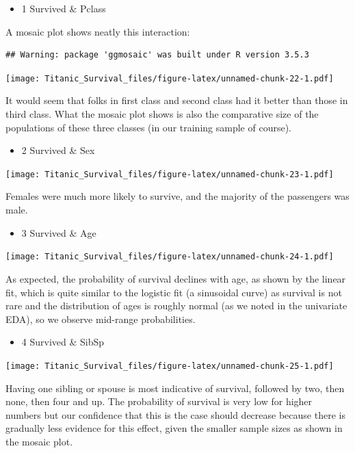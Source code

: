 \documentclass[]{article}
\providecommand{\tightlist}{%
  \setlength{\itemsep}{0pt}\setlength{\parskip}{0pt}}
\begin{document}
\begin{itemize}
\tightlist
\item
  1 Survived \& Pclass
\end{itemize}

A mosaic plot shows neatly this interaction:

\begin{verbatim}
## Warning: package 'ggmosaic' was built under R version 3.5.3
\end{verbatim}

\texttt{[image: Titanic\_Survival\_files/figure-latex/unnamed-chunk-22-1.pdf]}

It would seem that folks in first class and second class had it better
than those in third class. What the mosaic plot shows is also the
comparative size of the populations of these three classes (in our
training sample of course).

\begin{itemize}
\tightlist
\item
  2 Survived \& Sex
\end{itemize}

\texttt{[image: Titanic\_Survival\_files/figure-latex/unnamed-chunk-23-1.pdf]}

Females were much more likely to survive, and the majority of the
passengers was male.

\begin{itemize}
\tightlist
\item
  3 Survived \& Age
\end{itemize}

\texttt{[image: Titanic\_Survival\_files/figure-latex/unnamed-chunk-24-1.pdf]}

As expected, the probability of survival declines with age, as shown by
the linear fit, which is quite similar to the logistic fit (a sinusoidal
curve) as survival is not rare and the distribution of ages is roughly
normal (as we noted in the univariate EDA), so we observe mid-range
probabilities.

\begin{itemize}
\tightlist
\item
  4 Survived \& SibSp
\end{itemize}

\texttt{[image: Titanic\_Survival\_files/figure-latex/unnamed-chunk-25-1.pdf]}

Having one sibling or spouse is most indicative of survival, followed by
two, then none, then four and up. The probability of survival is very
low for higher numbers but our confidence that this is the case should
decrease because there is gradually less evidence for this effect, given
the smaller sample sizes as shown in the mosaic plot.
\end{document}
